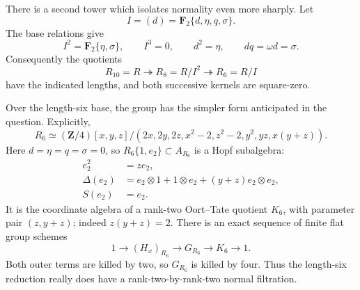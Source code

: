 \documentclass[11pt]{article}
\theoremstyle{remark}
\newcommand{\F}{\mathbf F}
\newcommand{\Z}{\mathbf Z}
\begin{document}
There is a second tower which isolates normality even more sharply.  Let
\begin{equation}\label{eq:d-ideal}
 I=(d)=\F_2\{d,\eta,q,\sigma\}.
\end{equation}
The base relations give
\begin{equation}\label{eq:d-ideal-powers}
 I^2=\F_2\{\eta,\sigma\},\qquad I^3=0,
 \qquad d^2=\eta,\qquad dq=\omega d=\sigma.
\end{equation}
Consequently the quotients
\begin{equation}\label{eq:6-8-10-tower}
 R_{10}=R\twoheadrightarrow
 R_8=R/I^2\twoheadrightarrow R_6=R/I
\end{equation}
have the indicated lengths, and both successive kernels are square-zero.

Over the length-six base, the group has the simpler form anticipated in the
question.  Explicitly,
\begin{equation}\label{eq:R6-presentation}
 R_6\simeq
 (\Z/4)[x,y,z]/
 (2x,2y,2z,x^2-2,z^2-2,y^2,yz,x(y+z)).
\end{equation}
Here \(d=\eta=q=\sigma=0\), so \(R_6\{1,e_2\}\subset A_{R_6}\) is a Hopf
subalgebra:
\begin{equation}\label{eq:K6}
\begin{aligned}
 e_2^2&=ze_2,\\
 \Delta(e_2)&=e_2\otimes1+1\otimes e_2
 +(y+z)e_2\otimes e_2,\\
 S(e_2)&=e_2.
\end{aligned}
\end{equation}
It is the coordinate algebra of a rank-two Oort--Tate quotient \(K_6\),
with parameter pair \((z,y+z)\); indeed \(z(y+z)=2\).  There is an exact
sequence of finite flat group schemes
\begin{equation}\label{eq:R6-extension}
 1\longrightarrow (H_x)_{R_6}
 \longrightarrow G_{R_6}\longrightarrow K_6\longrightarrow1.
\end{equation}
Both outer terms are killed by two, so \(G_{R_6}\) is killed by four.
Thus the length-six reduction really does have a rank-two-by-rank-two
normal filtration.
\end{document}
